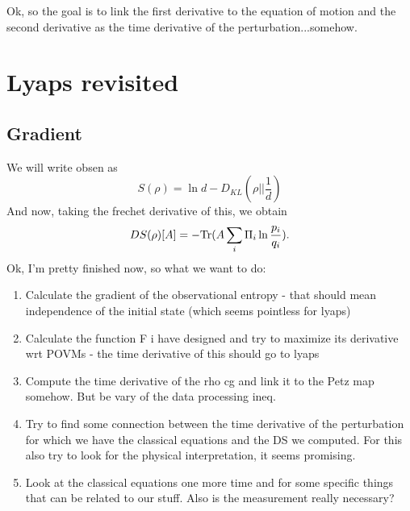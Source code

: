 \documentclass{article}
\begin{document}
Ok, so the goal is to link the first derivative to the equation of motion and the second derivative as the time derivative of the perturbation...somehow. 
\section{Lyaps revisited}
\subsection{Gradient}
We will write obsen as 
\[
    S(\rho) = \ln d - D_{KL}(\rho||\frac{1}{d})
\]
And now, taking the frechet derivative of this, we obtain
\[
    DS(\rho)[A] = -\text{Tr}(A\sum_i\Pi_i\ln\frac{p_i}{q_i}).
\]
Ok, I'm pretty finished now, so what we want to do:
\begin{enumerate}
    \item Calculate the gradient of the observational entropy - that should mean independence of the initial state (which seems pointless for lyaps)
    \item Calculate the function F i have designed and try to maximize its derivative wrt POVMs - the time derivative of this should go to lyaps
    \item Compute the time derivative of the rho cg and link it to the Petz map somehow. But be vary of the data processing ineq.
    \item Try to find some connection between the time derivative of the perturbation for which we have the classical equations and the DS we computed. For this also try to look for the physical interpretation, it seems promising.  
    \item Look at the classical equations one more time and for some specific things that can be related to our stuff. Also is the measurement really necessary?
\end{enumerate}
\end{document}
